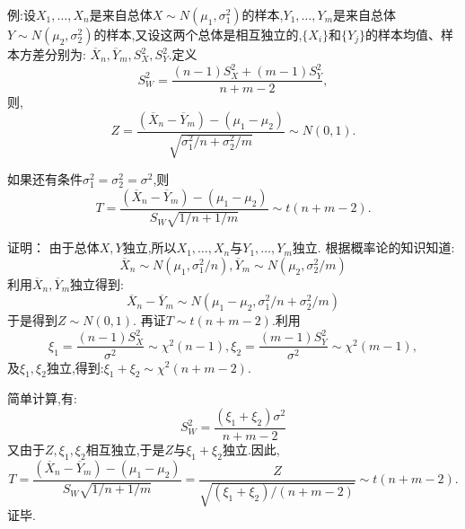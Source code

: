 	\begin{frame}
		例:设$X_1,\dots,X_n$是来自总体$X\sim N(\mu_1,\sigma_1^2)$的样本,$Y_1,\dots,Y_m$是来自总体$Y\sim N(\mu_2,\sigma_2^2)$的样本,又设这两个总体是相互独立的,$\{X_i\}$和$\{Y_j\}$的样本均值、样本方差分别为:
		$\overline{X}_n,\overline{Y}_m,S_X^2,S_Y^2$.定义
		\begin{equation}
			S_W^2 = \frac{(n-1)S_X^2+(m-1)S_Y^2}{n+m-2},
		\end{equation}
		则,
		\alert{
			\begin{equation}
				Z=\frac{(\overline{X}_n-\overline{Y}_m)-(\mu_1-\mu_2)}{\sqrt{\sigma_1^2/n+\sigma_2^2/m}}\sim N(0,1).
			\end{equation}
		}
	
		如果还有条件$\sigma_1^2 = \sigma_2^2 = \sigma^2$,则
		\alert{
			\begin{equation}
				T=\frac{(\overline{X}_n-\overline{Y}_m)-(\mu_1-\mu_2)}{S_W\sqrt{1/n+1/m}}\sim t(n+m-2).
			\end{equation}
		}
	\end{frame}

	\begin{frame}
		证明：	由于总体$X,Y$独立,所以$X_1,\dots,X_n$与$Y_1,\dots,Y_m$独立.
		根据概率论的知识知道:
		\begin{equation}
			\overline{X}_n\sim N(\mu_1,\sigma_1^2/n),\overline{Y}_m\sim N(\mu_2,\sigma_2^2/m)
		\end{equation}
		利用$\overline{X}_n,\overline{Y}_m$独立得到:
		\begin{equation}
			\overline{X}_n-\overline{Y}_m \sim N(\mu_1-\mu_2,\sigma_1^2/n+\sigma_2^2/m)
		\end{equation}
		于是得到$Z\sim N(0,1)$.
		再证$T\sim t(n+m-2)$.利用
		\begin{equation}
			\xi_1 = \frac{(n-1)S_X^2}{\sigma^2}\sim \chi^2(n-1),\xi_2 = \frac{(m-1)S_Y^2}{\sigma^2}\sim \chi^2(m-1),
		\end{equation}
		及$\xi_1,\xi_2$独立,得到:$\xi_1+\xi_2 \sim\chi^2(n+m-2)$.
	\end{frame}

	\begin{frame}
		简单计算,有:
		\begin{equation}
			S_W^2 = \frac{(\xi_1+\xi_2)\sigma^2}{n+m-2}
		\end{equation}
		又由于$Z,\xi_1,\xi_2$相互独立,于是$Z$与$\xi_1+\xi_2$独立.因此,
		\begin{equation}
			T=\frac{(\overline{X}_n-\overline{Y}_m)-(\mu_1-\mu_2)}{S_W\sqrt{1/n+1/m}} = \frac{Z}{\sqrt{(\xi_1+\xi_2)/(n+m-2)}}\sim t(n+m-2).
		\end{equation}
		证毕.
	\end{frame}

